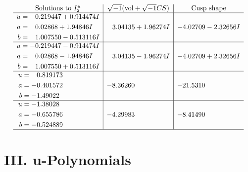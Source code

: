 \documentclass[1p]{elsarticle_modified}
\theoremstyle{definition}
\newcommand{\I}{\sqrt{-1}}
\begin{document}
$$\begin{array}{c|c|c}  
\text{Solutions to }I^u_{2}& \I (\text{vol} + \sqrt{-1}CS) & \text{Cusp shape}\\
 \hline 
\begin{aligned}
u &= -0.219447 + 0.914474 I \\
a &= \phantom{-}0.02868 + 1.94846 I \\
b &= \phantom{-}1.007550 - 0.513116 I\end{aligned}
 & \phantom{-}3.04135 + 1.96274 I & -4.02709 - 2.32656 I \\ \hline\begin{aligned}
u &= -0.219447 - 0.914474 I \\
a &= \phantom{-}0.02868 - 1.94846 I \\
b &= \phantom{-}1.007550 + 0.513116 I\end{aligned}
 & \phantom{-}3.04135 - 1.96274 I & -4.02709 + 2.32656 I \\ \hline\begin{aligned}
u &= \phantom{-}0.819173\phantom{ +0.000000I} \\
a &= -0.401572\phantom{ +0.000000I} \\
b &= -1.49022\phantom{ +0.000000I}\end{aligned}
 & -8.36260\phantom{ +0.000000I} & -21.5310\phantom{ +0.000000I} \\ \hline\begin{aligned}
u &= -1.38028\phantom{ +0.000000I} \\
a &= -0.655786\phantom{ +0.000000I} \\
b &= -0.524889\phantom{ +0.000000I}\end{aligned}
 & -4.29983\phantom{ +0.000000I} & -8.41490\phantom{ +0.000000I}\\
 \hline 
 \end{array}$$\newpage
\newpage\renewcommand{\arraystretch}{1}
\centering \section*{ III. u-Polynomials}
\end{document}
